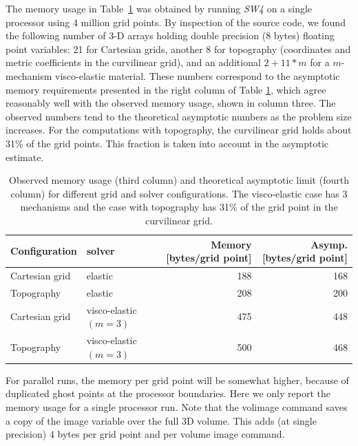\documentclass[11pt]{report}
\begin{document}
The memory usage in Table~\ref{tab:mem-usage} was obtained by running \emph{SW4} on a single processor
using 4 million grid points. By inspection of the source code, we found the following number of 3-D
arrays holding double precision (8 bytes) floating point variables:
21 for Cartesian grids, another
8 for topography (coordinates and metric coefficients in the curvilinear grid), and an additional
$2+11*m$ for a $m$-mechanism visco-elastic material. These numbers correspond to the asymptotic memory
 requirements presented in the right column of Table \ref{tab:mem-usage}, which agree reasonably well with the
 observed memory usage, shown in column three. The observed numbers tend to the theoretical asymptotic 
numbers as the problem size increases. For the computations with topography, the curvilinear grid holds about 31\%
of the grid points. This fraction is taken into account in the asymptotic estimate.
 \begin{table}
 \begin{center}
 \begin{tabular}{|l|l|r|r|}\hline
 Configuration   &  solver       & Memory [bytes/grid point]  & Asymp. [bytes/grid point] \\ \hline\hline
 Cartesian grid  & elastic       & 188   & 168       \\ \hline
 Topography      & elastic       & 208   &  200      \\ \hline 
 Cartesian grid  & visco-elastic $(m=3)$ & 475 & 448 \\ \hline 
 Topography      & visco-elastic $(m=3)$ & 500 & 468 \\ \hline 
 \end{tabular}
 \end{center}
 \caption{Observed memory usage (third column) and theoretical asymptotic limit (fourth column) for different 
   grid and solver configurations. The visco-elastic case has 3 mechanisms and the case with topography 
   has 31\% of the grid point in the curvilinear grid.}\label{tab:mem-usage}
 \end{table}

For parallel runs, the memory per grid point will be somewhat higher, because of duplicated 
ghost points at the processor boundaries. Here we only report the memory usage for a single processor run. 
Note that the volimage command saves a copy of the image variable over the full 3D volume. This adds (at single
precision) 4 bytes per grid point and per volume image command. 



 

\printindex
\end{document}
